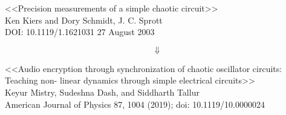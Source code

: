 
\begin{thebibliography}{99}
      <<Precision measurements of a simple chaotic circuit>> \\ Ken Kiers and Dory Schmidt, J. C. Sprott \\DOI: 10.1119/1.1621031 27 August 2003
\end{thebibliography}
\begin{equation*}
	\Downarrow
\end{equation*}
\begin{thebibliography}{99}
      <<Audio encryption through synchronization of chaotic oscillator circuits: Teaching non-
	linear dynamics through simple electrical circuits>> \\ 
	Keyur Mistry, Sudeshna Dash, and Siddharth Tallur\\
    American Journal of Physics 87, 1004 (2019); doi: 10.1119/10.0000024
\end{thebibliography}